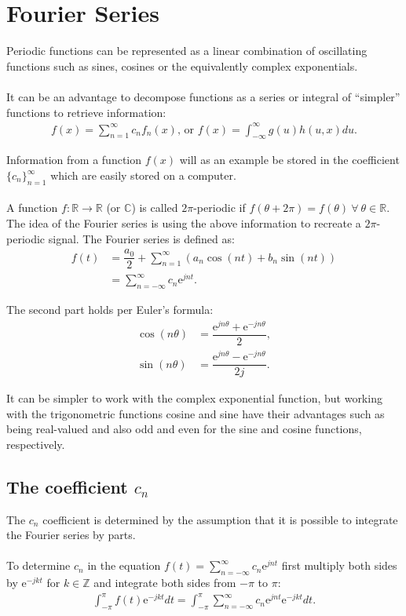 \chapter{Fourier Series} \label{appA:Fourierseries}
Periodic functions can be represented as a linear combination of oscillating functions such as sines, cosines or the equivalently complex exponentials.
\\ \\
It can be an advantage to decompose functions as a series or integral of ``simpler'' functions to retrieve information:
\begin{align*}
f(x) = \sum_{n=1}^\infty c_n f_n(x)\text{, or } f(x)= \int_{-\infty}^\infty g(u) h(u,x) du.
\end{align*}

Information from a function $f(x)$ will as an example be stored in the coefficient $\{c_n\}_{n=1}^\infty$ which are easily stored on a computer.
\\ \\
A function $f: \mathbb{R} \to \mathbb{R}$ (or $\mathbb{C}$) is called $2\pi$-periodic if $f(\theta + 2\pi) = f(\theta) \ \forall \ \theta\in\mathbb{R}$. The idea of the Fourier series is using the above information to recreate a $2\pi$-periodic signal. The Fourier series is defined as:
\begin{align*}
f(t) &= \dfrac{a_0}{2} + \sum_{n=1}^\infty(a_n \cos(n t) + b_n \sin(n t))\\
&= \sum_{n=-\infty}^{\infty} c_n \text{e}^{j n t}.
\end{align*}

The second part holds per Euler's formula:
\begin{align*}
\cos(n\theta) &= \dfrac{\text{e}^{j n \theta} + \text{e}^{-j n \theta}}{2}, \\
\sin(n \theta) &= \dfrac{\text{e}^{jn\theta}-\text{e}^{-jn\theta}}{2j}.
\end{align*}

It can be simpler to work with the complex exponential function, but working with the trigonometric functions cosine and sine have their advantages such as being real-valued and also odd and even for the sine and cosine functions, respectively.

\section{The coefficient $c_n$}
The $c_n$ coefficient is determined by the assumption that it is possible to integrate the Fourier series by parts.
\\ \\
To determine $c_n$ in the equation $f(t)= \sum_{n=-\infty}^{\infty} c_n \text{e}^{j n t}$ first multiply both sides by $\text{e}^{-j k t}$ for $k\in \mathbb{Z}$ and integrate both sides from $-\pi$ to $\pi$:
\begin{align} \label{eq:firststep_fouriercoefficient}
\int_{-\pi}^\pi f(t)\text{e}^{-j k t} dt = \int_{-\pi}^\pi \sum_{n=-\infty}^{\infty} c_n \text{e}^{j n t} \text{e}^{-j k t} dt.
\end{align}

